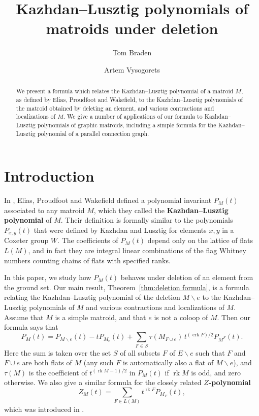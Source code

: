 \documentclass[12pt,reqno]{amsart}
\title{Kazhdan--Lusztig polynomials of matroids under deletion}
\author{Tom Braden}
\author{Artem Vysogorets}
\theoremstyle{definition}
\theoremstyle{remark}
\newcommand{\crk}{\operatorname{crk}}
\newcommand{\ssm}{\smallsetminus}
\newcommand{\rk}{\operatorname{rk}}
\renewcommand{\(}{\left(}
\renewcommand{\)}{\right)}
\newcommand{\<}{\left<}
\renewcommand{\>}{\right>}
\begin{document}
\begin{abstract}
We present a formula which relates the Kazhdan--Lusztig polynomial of a matroid $M$, as defined by Elias, Proudfoot and Wakefield, to the Kazhdan--Lusztig polynomials of the matroid  obtained by deleting an element, and various contractions and localizations of $M$.   We give a number of applications of our formula to Kazhdan--Lusztig polynomials of graphic matroids, including a simple formula for the Kazhdan--Lusztig polynomial of a parallel connection graph.
\end{abstract}

\maketitle

\section{Introduction}

In \cite{EPW}, Elias, Proudfoot and Wakefield defined a polynomial
invariant $P_M(t)$ associated to any matroid $M$, which they 
called the \textbf{Kazhdan--Lusztig polynomial} of $M$.  Their definition
is formally similar to the polynomials $P_{x,y}(t)$
that were defined by Kazhdan and Lusztig \cite{KL} for elements $x, y$ in a Coxeter group $W$.  The coefficients of $P_M(t)$ depend only on the lattice of flats $L(M)$, and in fact they are integral linear combinations of the flag Whitney numbers counting chains of flats with specified ranks.

In this paper, we study how $P_M(t)$ behaves under deletion of an element from the ground set.  Our main result,
Theorem~\ref{thm:deletion formula}, is a formula relating the Kazhdan--Lusztig polynomial
of the deletion $M\ssm e$ to the Kazhdan--Lusztig polynomials of $M$ and
various contractions and localizations of $M$. Assume that $M$ is a simple matroid, and that $e$ is not a coloop of $M$.  Then our formula says that 
\begin{equation}\label{eqn:deletion formula intro}
P_M(t) = P_{M \ssm e}(t) - tP_{M_e}(t) + \sum_{F\in S} \tau(M_{F\cup e})\, t^{(\crk F)/2} P_{M^F}(t).
\end{equation}
Here the sum is taken over the set $S$ of all subsets $F$ of $E \ssm e$ such that $F$ and $F \cup e$ are both flats of $M$ 
 (any such $F$ is automatically also a flat of $M\ssm e$), and $\tau(M)$ is the coefficient of $t^{(\rk M -1)/2}$ in $P_M(t)$ if $\rk M$ is odd, and zero otherwise.
We also give a similar formula
for the closely related \textbf{$Z$-polynomial}
\[Z_M(t) = \sum_{F\in L(M)} t^{\rk F}P_{M_F}(t),\]
which was introduced in \cite{PXY}.  
\end{document}
